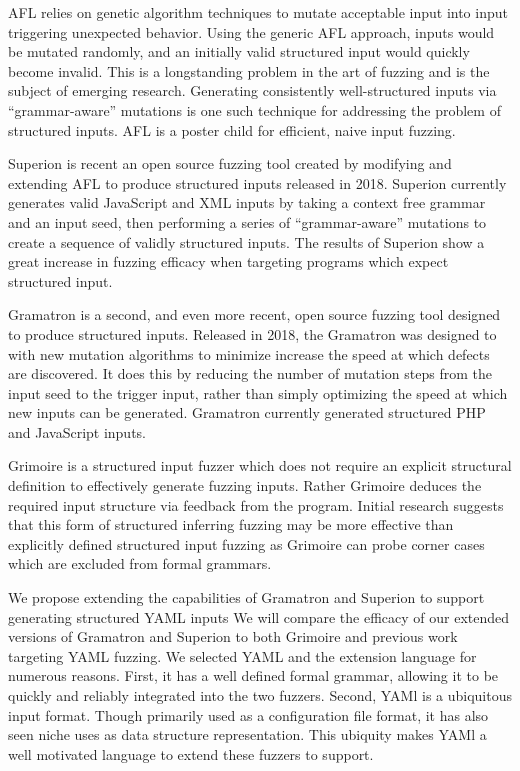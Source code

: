 \documentclass[12pt]{diazessay}
\begin{document}
AFL\cite{AFL_page} relies on genetic algorithm techniques\cite{InputMutationAlgorithm} to mutate acceptable input into input triggering unexpected behavior. Using the generic AFL approach, inputs would be mutated randomly, and an initially valid structured input would quickly become invalid.
This is a longstanding problem in the art of fuzzing and is the subject of emerging research.
Generating consistently well-structured inputs\cite{structuredInput} via ``grammar-aware'' mutations is one such technique for addressing the problem of structured inputs.
AFL is a poster child for efficient, naive input fuzzing.

Superion\cite{superion} is recent an open source fuzzing tool created by modifying and extending AFL to produce structured inputs released in 2018.
Superion currently generates valid JavaScript and XML inputs by taking a context free grammar and an input seed, then performing a series of ``grammar-aware'' mutations to create a sequence of validly structured inputs.
The results of Superion show a great increase in fuzzing efficacy when targeting programs which expect structured input.

Gramatron\cite{srivastava2021gramatron} is a second, and even more recent, open source fuzzing tool designed to produce structured inputs.
Released in 2018, the Gramatron was designed to with new mutation algorithms to minimize increase the speed at which defects are discovered.
It does this by reducing the number of mutation steps from the input seed to the trigger input, rather than simply optimizing the speed at which new inputs can be generated.
Gramatron currently generated structured PHP and JavaScript inputs.

Grimoire is a structured input fuzzer which does not require an explicit structural definition to effectively generate fuzzing inputs.
Rather Grimoire deduces the required input structure via feedback from the program.
Initial research suggests that this form of structured inferring fuzzing may be more effective than explicitly defined structured input fuzzing as Grimoire can probe corner cases which are excluded from formal grammars.

We propose extending the capabilities of Gramatron and Superion to support generating structured YAML\cite{YAMLdraft} inputs
We will compare the efficacy of our extended versions of Gramatron and Superion to both Grimoire and previous work targeting YAML fuzzing.
We selected YAML and the extension language for numerous reasons.
First, it has a well defined formal grammar, allowing it to be quickly and reliably integrated into the two fuzzers.
Second, YAMl is a ubiquitous input format.
Though primarily used as a configuration file format, it has also seen niche uses as data structure representation.
This ubiquity makes YAMl a well motivated language to extend these fuzzers to support.
\end{document}
